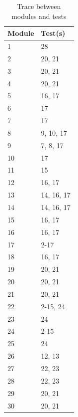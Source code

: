 \documentclass[12pt, titlepage]{article}
\begin{document}
\begin{table}[ht]
\caption{Trace between modules and tests} \label{tab:tracemod}
\begin{tabularx}{\textwidth}{p{5cm}X}
\toprule {\bf Module} & {\bf Test(s)}\\
\midrule
1	&	28	\\
2	&	20, 21	\\
3	&	20, 21	\\
4	&	20, 21	\\
5	&	16, 17	\\
6	&	17	\\
7	&	17	\\
8	&	9, 10, 17	\\
9	&	7, 8, 17\\
10	&	17	\\
11	&	15	\\
12	&	16, 17	\\
13	&	14, 16, 17	\\
14	&	14, 16, 17	\\
15	&	16, 17	\\
16	&	16, 17	\\
17	&	2-17	\\
18	&	16, 17	\\
19	&	20, 21	\\
20	&	20, 21	\\
21	&	20, 21	\\
22	&	2-15, 24	\\
23	&	24	\\
24	&	2-15	\\
25	&	24	\\
26	&	12, 13	\\
27	&	22, 23	\\
28  &    22, 23   \\
29  &    20, 21   \\
30 & 20, 21\\
\bottomrule
\end{tabularx}
\end{table}
\end{document}
